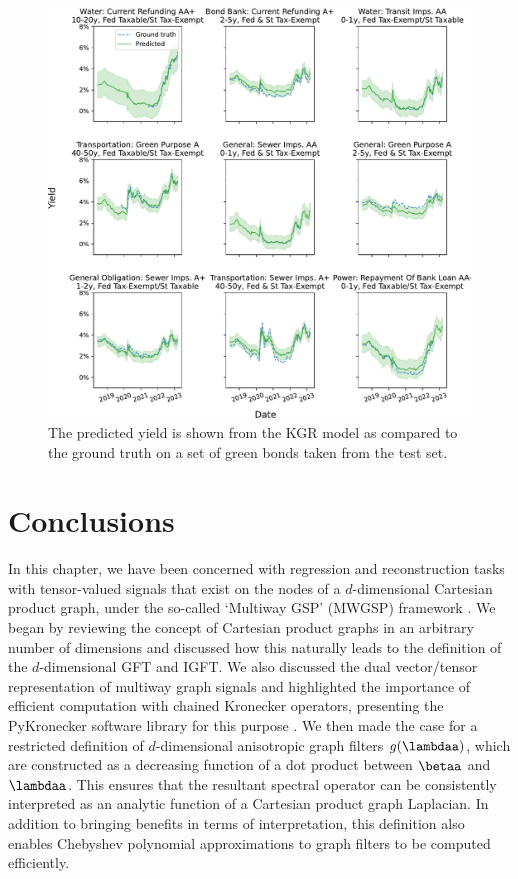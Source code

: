 \begin{figure}[t]  
    \begin{center}
        \includegraphics[width=\linewidth]{Figures/yield_predictions_KGR.pdf}
    \end{center}
   \caption[The output of the KGR model on several green bonds from the test set]{The predicted yield is shown from the KGR model as compared to the ground truth on a set of green bonds taken from the test set. } 
    \label{fig:yield_predictions_KGR}
\end{figure} 

\newpage

\section{Conclusions}

In this chapter, we have been concerned with regression and reconstruction tasks with tensor-valued signals that exist on the nodes of a $d$-dimensional Cartesian product graph, under the so-called `Multiway GSP' (MWGSP) framework \citep{Stanley2020}. We began by reviewing the concept of Cartesian product graphs in an arbitrary number of dimensions and discussed how this naturally leads to the definition of the $d$-dimensional GFT and IGFT. We also discussed the dual vector/tensor representation of multiway graph signals and highlighted the importance of efficient computation with chained Kronecker operators, presenting the PyKronecker software library for this purpose \citep{Antonian2023}. We then made the case for a restricted definition of $d$-dimensional anisotropic graph filters $g(\lambdaa)$, which are constructed as a decreasing function of a dot product between $\betaa$ and $\lambdaa$. This ensures that the resultant spectral operator can be consistently interpreted as an analytic function of a Cartesian product graph Laplacian. In addition to bringing benefits in terms of interpretation, this definition also enables Chebyshev polynomial approximations to graph filters to be computed efficiently. 

